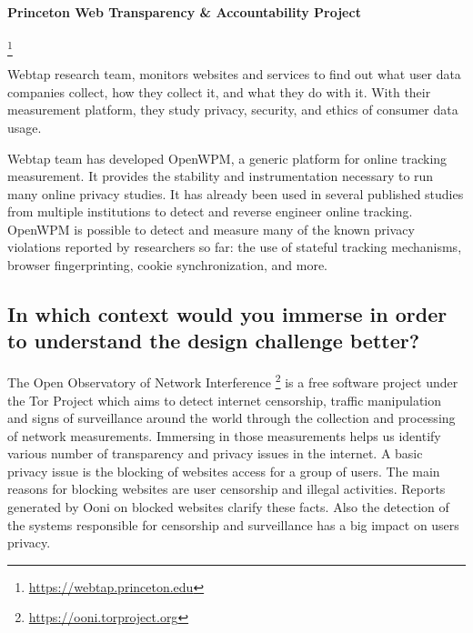 \paragraph{Princeton Web Transparency \& Accountability Project}
\footnote{\url{https://webtap.princeton.edu}}

Webtap research team, monitors websites and services to find out what user data 
companies collect, how they collect it, and what they do with it. With their 
measurement platform, they study privacy, security, and ethics of consumer data 
usage.

Webtap team has developed  OpenWPM, a generic platform for online tracking 
measurement. It provides the stability and instrumentation necessary to run many 
online privacy studies. It has already been used in several published studies 
from multiple institutions to detect and reverse engineer online tracking.
OpenWPM  is possible to detect and measure many of the known privacy violations 
reported by researchers so far: the use of stateful tracking mechanisms, browser 
fingerprinting, cookie synchronization, and more.

\subsection{In which context would you immerse in order to understand the design 
challenge better?}

The Open Observatory of Network Interference 
\footnote{\url{https://ooni.torproject.org}} is a free software project under 
the Tor Project which aims to detect internet censorship, traffic manipulation 
and signs of surveillance around the world through the collection and processing 
of network measurements. Immersing in those measurements helps us identify 
various number of transparency and privacy issues in the internet.  
A basic privacy issue is the blocking of websites  access for a group of users. 
The main reasons for blocking websites are user censorship and illegal 
activities. Reports generated by Ooni  on blocked websites clarify these facts. 
Also the detection of the systems responsible for censorship and surveillance 
has a big impact on users privacy.

